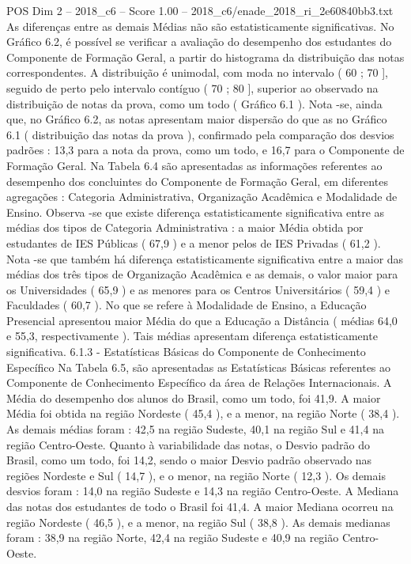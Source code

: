 \begin{textsample}{POS Dim 2 – 2018\_c6 – Score 1.00 – 2018\_c6/enade\_2018\_ri\_2e60840bb3.txt}
As diferenças entre as demais Médias não são estatisticamente significativas.
No Gráfico 6.2, é possível se verificar a avaliação do desempenho dos estudantes do Componente de Formação Geral, a partir do histograma da distribuição das notas correspondentes.
A distribuição é unimodal, com moda no intervalo ( 60 ; 70 ], seguido de perto pelo intervalo contíguo ( 70 ; 80 ], superior ao observado na distribuição de notas da prova, como um todo ( Gráfico 6.1 ).
Nota -se, ainda que, no Gráfico 6.2, as notas apresentam maior dispersão do que as no Gráfico 6.1 ( distribuição das notas da prova ), confirmado pela comparação dos desvios padrões : 13,3 para a nota da prova, como um todo, e 16,7 para o Componente de Formação Geral.
Na Tabela 6.4 são apresentadas as informações referentes ao desempenho dos concluintes do Componente de Formação Geral, em diferentes agregações : Categoria Administrativa, Organização Acadêmica e Modalidade de Ensino.
Observa -se que existe diferença estatisticamente significativa entre as médias dos tipos de Categoria Administrativa : a maior Média obtida por estudantes de IES Públicas ( 67,9 ) e a menor pelos de IES Privadas ( 61,2 ).
Nota -se que também há diferença estatisticamente significativa entre a maior das médias dos três tipos de Organização Acadêmica e as demais, o valor maior para os Universidades ( 65,9 ) e as menores para os Centros Universitários ( 59,4 ) e Faculdades ( 60,7 ).
No que se refere à Modalidade de Ensino, a Educação Presencial apresentou maior Média do que a Educação a Distância ( médias 64,0 e 55,3, respectivamente ).
Tais médias apresentam diferença estatisticamente significativa. 6.1.3 - Estatísticas Básicas do Componente de Conhecimento Específico Na Tabela 6.5, são apresentadas as Estatísticas Básicas referentes ao Componente de Conhecimento Específico da área de Relações Internacionais.
A Média do desempenho dos alunos do Brasil, como um todo, foi 41,9.
A maior Média foi obtida na região Nordeste ( 45,4 ), e a menor, na região Norte ( 38,4 ).
As demais médias foram : 42,5 na região Sudeste, 40,1 na região Sul e 41,4 na região Centro-Oeste.
Quanto à variabilidade das notas, o Desvio padrão do Brasil, como um todo, foi 14,2, sendo o maior Desvio padrão observado nas regiões Nordeste e Sul ( 14,7 ), e o menor, na região Norte ( 12,3 ).
Os demais desvios foram : 14,0 na região Sudeste e 14,3 na região Centro-Oeste.
A Mediana das notas dos estudantes de todo o Brasil foi 41,4.
A maior Mediana ocorreu na região Nordeste ( 46,5 ), e a menor, na região Sul ( 38,8 ).
As demais medianas foram : 38,9 na região Norte, 42,4 na região Sudeste e 40,9 na região Centro-Oeste.

\end{textsample}
